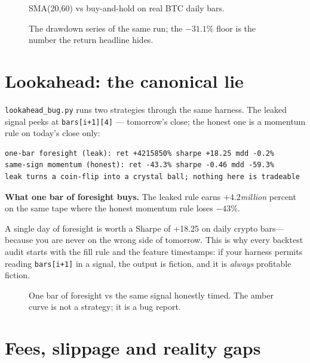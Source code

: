 \begin{figure}[htbp]\centering

\caption{SMA(20,60) vs buy-and-hold on real BTC daily bars.}
\label{fig:eqcurve}
\end{figure}

\begin{figure}[htbp]\centering

\caption{The drawdown series of the same run; the $-31.1$\% floor is the number the
return headline hides.}
\label{fig:dd08}
\end{figure}

\section{Lookahead: the canonical lie}\label{sec:lookahead}

\texttt{lookahead\_bug.py} runs two strategies through the same harness. The
leaked signal peeks at \texttt{bars[i+1][4]} --- tomorrow's close; the honest one
is a momentum rule on today's close only:
\begin{lstlisting}[numbers=none]
one-bar foresight (leak): ret +4215850% sharpe +18.25 mdd -0.2%
same-sign momentum (honest): ret -43.3% sharpe -0.46 mdd -59.3%
leak turns a coin-flip into a crystal ball; nothing here is tradeable
\end{lstlisting}

\begin{example}\label{ex:leak}
\textbf{What one bar of foresight buys.} The leaked rule earns $+4.2$\emph{million} percent on the same tape
where the honest momentum rule loses $-43$\%.
\begin{solution}
A single day of foresight is worth a Sharpe of +18.25 on daily crypto bars---because you are
never on the wrong side of tomorrow. This is why every backtest audit starts with the fill
rule and the feature timestamps: if your harness permits reading \texttt{bars[i+1]} in a
signal, the output is fiction, and it is \emph{always} profitable fiction.
\end{solution}
\end{example}

\begin{figure}[htbp]\centering

\caption{One bar of foresight vs the same signal honestly timed. The amber curve is not a
strategy; it is a bug report.}
\label{fig:leakcurve}
\end{figure}

\section{Fees, slippage and reality gaps}\label{sec:btfrictions}

